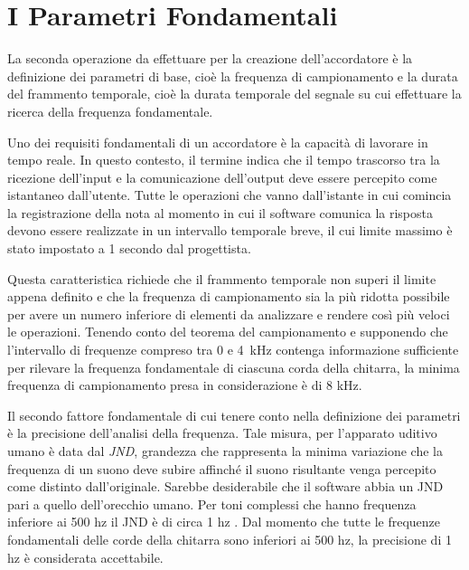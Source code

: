 \chapter{I Parametri Fondamentali}\label{cap:parametri}

La seconda operazione da effettuare per la creazione dell'accordatore è la definizione dei parametri di base, cioè la frequenza di campionamento e la durata del frammento temporale, cioè la durata temporale del segnale su cui effettuare la ricerca della frequenza fondamentale.  

Uno dei requisiti fondamentali di un accordatore è la capacità di lavorare in tempo reale. 
In questo contesto, il termine indica che il tempo trascorso tra la ricezione dell'input e la comunicazione dell'output deve essere percepito come istantaneo dall'utente. 
Tutte le operazioni che vanno dall'istante in cui comincia la registrazione della nota al momento in cui il software comunica la risposta devono essere realizzate in un intervallo temporale breve, il cui limite massimo è stato impostato a 1 secondo dal progettista. 

Questa caratteristica richiede che il frammento temporale non superi il limite appena definito e che la frequenza di campionamento sia la più ridotta possibile per avere un numero inferiore di elementi da analizzare e rendere così più veloci le operazioni.
Tenendo conto del teorema del campionamento e supponendo che l'intervallo di frequenze compreso tra 0 e \mbox{4 kHz} contenga informazione sufficiente per rilevare la frequenza fondamentale di ciascuna corda della chitarra, la minima frequenza di campionamento presa in considerazione è di 8 kHz.

Il secondo fattore fondamentale di cui tenere conto nella definizione dei parametri è la precisione dell'analisi della frequenza.
Tale misura, per l'apparato uditivo umano è data dal \emph{JND}, grandezza che rappresenta la minima variazione che la frequenza di un suono deve subire affinché il suono risultante venga percepito come distinto dall'originale.
Sarebbe desiderabile che il software abbia un \mbox{JND} pari a quello dell'orecchio umano. 
Per toni complessi che hanno frequenza inferiore ai 500 hz il \mbox{JND} è di circa 1 hz . 
Dal momento che tutte le frequenze fondamentali delle corde della chitarra sono inferiori ai 500 hz, la precisione di 1 hz è considerata accettabile.

